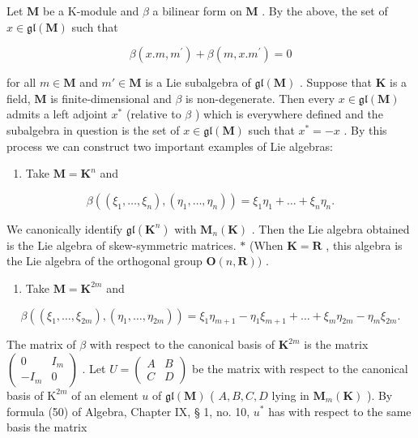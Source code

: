 Let \(\mathbf{M}\) be a K-module and \(\beta\) a bilinear form on \(\mathbf{M}\) . By the above, the set of \(x \in \mathfrak{gl}(\mathbf{M})\) such that

\[
\beta (x. m, m ^ {\prime}) + \beta (m, x. m ^ {\prime}) = 0
\]

for all \(m \in \mathbf{M}\) and \(m' \in \mathbf{M}\) is a Lie subalgebra of \(\mathfrak{gl}(\mathbf{M})\) . Suppose that \(\mathbf{K}\) is a field, \(\mathbf{M}\) is finite-dimensional and \(\beta\) is non-degenerate. Then every \(x \in \mathfrak{gl}(\mathbf{M})\) admits a left adjoint \(x^*\) (relative to \(\beta\) ) which is everywhere defined and the subalgebra in question is the set of \(x \in \mathfrak{gl}(\mathbf{M})\) such that \(x^* = -x\) . By this process we can construct two important examples of Lie algebras:

\begin{enumerate}
\def\labelenumi{(\alph{enumi})}
\tightlist
\item
  Take \(\mathbf{M} = \mathbf{K}^n\) and
\end{enumerate}

\[
\beta ((\xi_ {1}, \dots , \xi_ {n}), (\eta_ {1}, \dots , \eta_ {n})) = \xi_ {1} \eta_ {1} + \dots + \xi_ {n} \eta_ {n}.
\]

We canonically identify \(\mathfrak{gl}(\mathbf{K}^n)\) with \(\mathbf{M}_n(\mathbf{K})\) . Then the Lie algebra obtained is the Lie algebra of skew-symmetric matrices. \(*\) (When \(\mathbf{K} = \mathbf{R}\) , this algebra is the Lie algebra of the orthogonal group \(\mathbf{O}(n, \mathbf{R}))\) .

\begin{enumerate}
\def\labelenumi{(\alph{enumi})}
\setcounter{enumi}{1}
\tightlist
\item
  Take \(\mathbf{M} = \mathbf{K}^{2m}\) and
\end{enumerate}

\[
\beta ((\xi_ {1}, \dots , \xi_ {2 m}), (\eta_ {1}, \dots , \eta_ {2 m})) = \xi_ {1} \eta_ {m + 1} - \eta_ {1} \xi_ {m + 1} + \dots + \xi_ {m} \eta_ {2 m} - \eta_ {m} \xi_ {2 m}.
\]

The matrix of \(\beta\) with respect to the canonical basis of \(\mathbf{K}^{2m}\) is the matrix \(\left( \begin{array}{cc}0 & I_m\\ -I_m & 0 \end{array} \right)\) . Let \(U = \left( \begin{array}{cc}A & B\\ C & D \end{array} \right)\) be the matrix with respect to the canonical basis of \(\mathrm{K}^{2m}\) of an element \(u\) of \(\mathfrak{gl}(\mathbf{M})\) ( \(A,B,C,D\) lying in \(\mathbf{M}_m(\mathbf{K})\) ). By formula (50) of Algebra, Chapter IX, § 1, no. 10, \(u^*\) has with respect to the same basis the matrix

